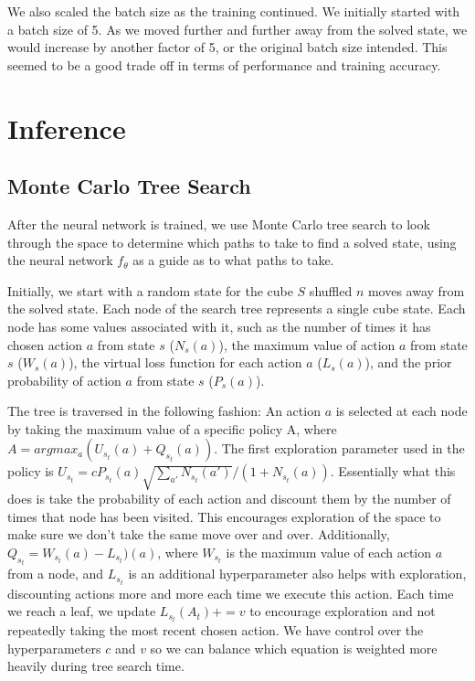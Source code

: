 \documentclass[10pt,twocolumn,letterpaper]{article}
\begin{document}
We also scaled the batch size as the training continued. We initially started with a batch size of 5. As we moved further and further away from the solved state, we would increase by another factor of 5, or the original batch size intended. This seemed to be a good trade off in terms of performance and training accuracy.


\section{Inference}

\subsection{Monte Carlo Tree Search}

After the neural network is trained, we use Monte Carlo tree search to look through the space to determine which paths to take to find a solved state, using the neural network $f_\theta$ as a guide as to what paths to take. 

Initially, we start with a random state for the cube $S$ shuffled $n$ moves away from the solved state. Each node of the search tree represents a single cube state. Each node has some values associated with it, such as the number of times it has chosen action $a$ from state $s$ ($N_{s}(a)$), the maximum value of action $a$ from state $s$ ($W_{s}(a)$), the virtual loss function for each action $a$ ($L_{s}(a)$), and the prior probability of action $a$ from state $s$ ($P_{s}(a)$).

The tree is traversed in the following fashion: An action $a$ is selected at each node by taking the maximum value of a specific policy A, where $A=argmax_a (U_{s_{t}}(a) + Q_{s_{t}}(a)) $. The first exploration parameter used in the policy is $U_{s_{t}} = cP_{s_{t}}(a) \sqrt{\sum_{a'}N_{s_{t}}(a')}/(1 + N_{s_{t}}(a))$. Essentially what this does is take the probability of each action and discount them by the number of times that node has been visited. This encourages exploration of the space to make sure we don't take the same move over and over. Additionally, $Q_{s_{t}}= W_{s_{t}}(a) - L_{s_{t}})(a)$, where $W_{s_{t}}$ is the maximum value of each action $a$ from a node, and $L_{s_{t}}$ is an additional hyperparameter also helps with exploration, discounting actions more and more each time we execute this action. Each time we reach a leaf, we update $L_{s_{t}}(A_t) += v$ to encourage exploration and not repeatedly taking the most recent chosen action. We have control over the hyperparameters $c$ and $v$ so we can balance which equation is weighted more heavily during tree search time.
\end{document}
